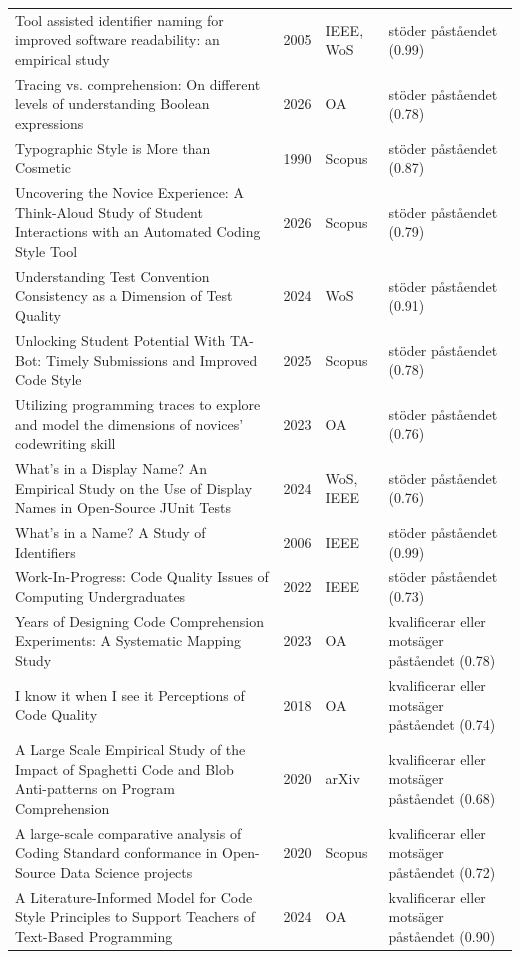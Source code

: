 \begin{longtable}{@{}%
  >{\raggedright\arraybackslash}p{}c%
  >{\raggedright\arraybackslash}p{}%
  >{\raggedright\arraybackslash}p{}@{}}
Tool assisted identifier naming for improved software readability: an empirical study & 2005 & IEEE, WoS & stöder påståendet (0.99) \\
Tracing vs. comprehension: On different levels of understanding Boolean expressions & 2026 & OA & stöder påståendet (0.78) \\
Typographic Style is More than Cosmetic & 1990 & Scopus & stöder påståendet (0.87) \\
Uncovering the Novice Experience: A Think-Aloud Study of Student Interactions with an Automated Coding Style Tool & 2026 & Scopus & stöder påståendet (0.79) \\
Understanding Test Convention Consistency as a Dimension of Test Quality & 2024 & WoS & stöder påståendet (0.91) \\
Unlocking Student Potential With TA-Bot: Timely Submissions and Improved Code Style & 2025 & Scopus & stöder påståendet (0.78) \\
Utilizing programming traces to explore and model the dimensions of novices' codewriting skill & 2023 & OA & stöder påståendet (0.76) \\
What's in a Display Name? An Empirical Study on the Use of Display Names in Open-Source JUnit Tests & 2024 & WoS, IEEE & stöder påståendet (0.76) \\
What's in a Name? A Study of Identifiers & 2006 & IEEE & stöder påståendet (0.99) \\
Work-In-Progress: Code Quality Issues of Computing Undergraduates & 2022 & IEEE & stöder påståendet (0.73) \\
40 Years of Designing Code Comprehension Experiments: A Systematic Mapping Study & 2023 & OA & kvalificerar eller motsäger påståendet (0.78) \\
\textquotedbl{}I know it when I see it\textquotedbl{} Perceptions of Code Quality & 2018 & OA & kvalificerar eller motsäger påståendet (0.74) \\
A Large Scale Empirical Study of the Impact of Spaghetti Code and Blob Anti-patterns on Program Comprehension & 2020 & arXiv & kvalificerar eller motsäger påståendet (0.68) \\
A large-scale comparative analysis of Coding Standard conformance in Open-Source Data Science projects & 2020 & Scopus & kvalificerar eller motsäger påståendet (0.72) \\
A Literature-Informed Model for Code Style Principles to Support Teachers of Text-Based Programming & 2024 & OA & kvalificerar eller motsäger påståendet (0.90) \\

\end{longtable}
